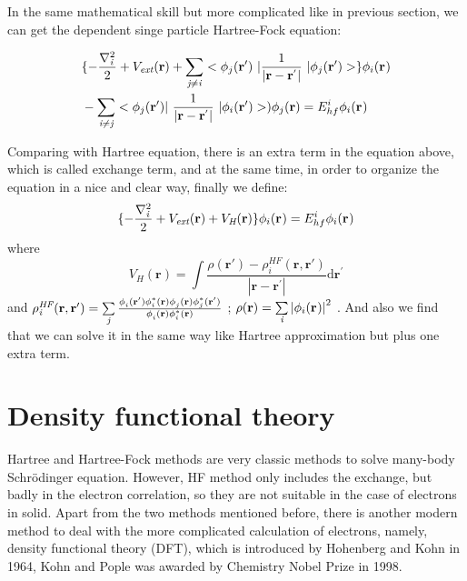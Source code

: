\documentclass[a4paper]{report}
\begin{document}
\noindent In the same mathematical skill but more complicated like in previous section, we can get the dependent singe particle Hartree-Fock equation:

\begin{equation}\begin{split}
& \{ -\frac{\nabla^{2}_{\textit i}}{2} + V_\textit{ext}(\textbf{r})+ \suminj<j><i> <\bwfn<j><'>\ | \frac{1}{|\textbf{r} - \textbf{r}^{'} |} \ | \bwfn<j><'>> \} \bwf<i><>  \\
& - \suminj<i><j>  < \bwfn<j><'>|\ \frac{1}{|\textbf{r} - \textbf{r}^{'} |} \ | \bwfn<i><'> >) \bwfn<j><>  = E^{i}_{hf} \bwf<i><>
\end{split}\end{equation}

\noindent Comparing with Hartree equation, there is an extra term in the equation above, which is called exchange term, and at the same time,
 in order to organize the equation in a nice and clear way, finally we define:
\begin{equation}\begin{split}
\{ -\frac{\nabla^{2}_{\textit i}}{2} + V_\textit{ext}(\textbf{r}) +V_\textit{H}(\textbf{r}) \}  \bwf<i><>  = E^{i}_{hf}   \bwf<i><> 
\end{split}\end{equation}
where
\begin{equation}
 V_\textit{H}(\textbf{r})= \int \frac{\rho(\textbf{r}{'}) - \rho_{\textit{i}}^{\textit{HF}}(\textbf{r},\textbf{r}{'})}{|\textbf{r} - \textbf{r}^{'} |}  \mathrm{d}\textbf{r}^{'}
\end{equation}
and $ \rho_{\textit{i}}^{\textit{HF}}(\textbf{r},\textbf{r}{'}) = \sumi<j> \frac{\phi_{i}^{}(\textbf{r}{'}) \phi_{i}^{*}(\textbf{r}{}) \phi_{j}^{}(\textbf{r}{}) \phi_{j}^{*}(\textbf{r}{'})} {\phi_{i}^{}(\textbf{r}) \phi_{i}^{*}(\textbf{r})} $ 
; $\rho(\textbf{r}) = \sumi<i>  {|\bwf<i><>|}^{2}$ . And also we find that we can solve it in the same way like Hartree approximation but plus one
extra term.

\section{Density functional theory}
\noindent Hartree and Hartree-Fock methods are very classic methods to solve many-body Schrödinger equation. However, HF method only includes the exchange,
 but badly in the electron correlation, so they are not suitable in the case of electrons in solid. Apart from the two methods mentioned before, there is another modern method to deal with
 the more complicated calculation of electrons, namely, density functional theory (DFT), which is introduced by Hohenberg and
 Kohn in 1964, Kohn and Pople was awarded by Chemistry Nobel Prize in 1998.
\end{document}
